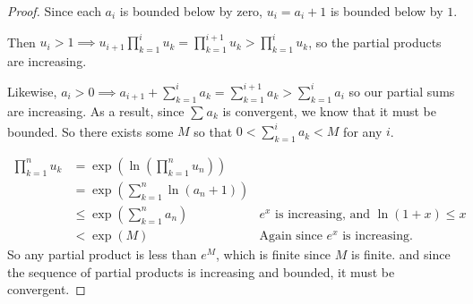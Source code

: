 \documentclass{article}
\begin{document}
\begin{enumerate}
\begin{enumerate}
\begin{proof}
    Since each $a_i$ is bounded below by zero, $u_i=a_i+1$ is bounded below by $1$.

    Then  $u_i>1\implies u_{i+1} \prod_{k=1}^{i} u_k =\prod_{k=1}^{i+1} u_k>\prod_{k=1}^{i} u_k $, so the partial products are increasing.

    Likewise, $a_i>0\implies a_{i+1}+\sum_{k=1}^{i} a_k=\sum_{k=1}^{i+1} a_k>\sum_{k=1}^{i} a_i$ so our partial sums are increasing. As a result, since $\sum_{}^{} a_k$ is convergent,
    we know that it must be bounded. So there exists some $M$ so that $0<\sum_{k=1}^{i} a_k<M$ for any $i$.

    \begin{align*}
        \prod_{k=1}^{n}  u_k&=\exp\left( \ln\left( \prod_{k=1}^{n} u_n  \right)  \right) \\
                &=\exp\left( \sum_{k=1}^{n}\ln\left(  a_n+1  \right)  \right)\\
                &\leq\exp\left( \sum_{k=1}^{n}a_n \right)&\text{$e^{x}$ is increasing, and $\ln(1+x)\leq x$}\\
                &<\exp (M)&\text{Again since $e^x$ is increasing}
    .\end{align*}       
    So any partial product is less than $e^M$, which is finite since $M$ is finite. and since the sequence of partial products is increasing and bounded, it must be convergent.

\end{proof}
\end{enumerate}
\end{enumerate}
\end{document}
